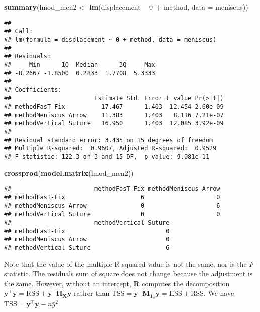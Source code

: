 \documentclass[]{book}
\newenvironment{Shaded}{\begin{snugshade}}{\end{snugshade}}
\newcommand{\DataTypeTok}[1]{\textcolor[rgb]{0.13,0.29,0.53}{#1}}
\newcommand{\DecValTok}[1]{\textcolor[rgb]{0.00,0.00,0.81}{#1}}
\newcommand{\KeywordTok}[1]{\textcolor[rgb]{0.13,0.29,0.53}{\textbf{#1}}}
\newcommand{\NormalTok}[1]{#1}
\newcommand{\OperatorTok}[1]{\textcolor[rgb]{0.81,0.36,0.00}{\textbf{#1}}}
\newcommand{\StringTok}[1]{\textcolor[rgb]{0.31,0.60,0.02}{#1}}
\theoremstyle{definition}
\theoremstyle{definition}
\theoremstyle{definition}
\theoremstyle{remark}
\begin{document}
\begin{Shaded}
\begin{Highlighting}[]
\KeywordTok{summary}\NormalTok{(lmod_men2 <-}\StringTok{ }\KeywordTok{lm}\NormalTok{(displacement }\OperatorTok{~}\StringTok{ }\DecValTok{0} \OperatorTok{+}\StringTok{ }\NormalTok{method, }\DataTypeTok{data =}\NormalTok{ meniscus))}
\end{Highlighting}
\end{Shaded}

\begin{verbatim}
## 
## Call:
## lm(formula = displacement ~ 0 + method, data = meniscus)
## 
## Residuals:
##     Min      1Q  Median      3Q     Max 
## -8.2667 -1.8500  0.2833  1.7708  5.3333 
## 
## Coefficients:
##                       Estimate Std. Error t value Pr(>|t|)
## methodFasT-Fix          17.467      1.403  12.454 2.60e-09
## methodMeniscus Arrow    11.383      1.403   8.116 7.21e-07
## methodVertical Suture   16.950      1.403  12.085 3.92e-09
## 
## Residual standard error: 3.435 on 15 degrees of freedom
## Multiple R-squared:  0.9607, Adjusted R-squared:  0.9529 
## F-statistic: 122.3 on 3 and 15 DF,  p-value: 9.081e-11
\end{verbatim}

\begin{Shaded}
\begin{Highlighting}[]
\KeywordTok{crossprod}\NormalTok{(}\KeywordTok{model.matrix}\NormalTok{(lmod_men2))}
\end{Highlighting}
\end{Shaded}

\begin{verbatim}
##                       methodFasT-Fix methodMeniscus Arrow
## methodFasT-Fix                     6                    0
## methodMeniscus Arrow               0                    6
## methodVertical Suture              0                    0
##                       methodVertical Suture
## methodFasT-Fix                            0
## methodMeniscus Arrow                      0
## methodVertical Suture                     6
\end{verbatim}

Note that the value of the multiple R-squared value is not the same, nor
is the \(F\)-statistic. The residuals sum of square does not change
because the adjustment is the same. However, without an intercept,
\textbf{R} computes the decomposition
\(\boldsymbol{y}^\top\boldsymbol{y} = \mathrm{RSS} + \boldsymbol{y}^\top\mathbf{H}_{\mathbf{X}}\boldsymbol{y}\)
rather than
\(\mathrm{TSS} = \boldsymbol{y}^\top\mathbf{M}_{\mathbf{1}_n}\boldsymbol{y}= \mathrm{ESS}+\mathrm{RSS}\).
We have \(\mathrm{TSS} = \boldsymbol{y}^\top\boldsymbol{y}-n\bar{y}^2\).
\end{document}

